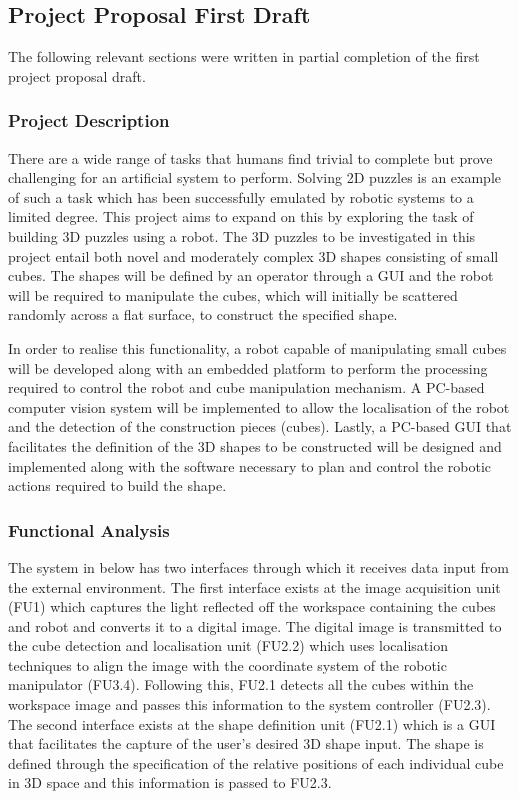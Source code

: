 \subsection{Project Proposal First Draft}

The following relevant sections were written in partial completion of the first project proposal draft.

\subsubsection{Project Description}

There are a wide range of tasks that humans find trivial to complete but prove challenging for an artificial system to perform. Solving 2D puzzles is an example of such a task which has been successfully emulated by robotic systems to a limited degree. This project aims to expand on this by exploring the task of building 3D puzzles using a robot. The 3D puzzles to be investigated in this project entail both novel and moderately complex 3D shapes consisting of small cubes. The shapes will be defined by an operator through a \ac{GUI} and the robot will be required to manipulate the cubes, which will initially be scattered randomly across a flat surface, to construct the specified shape.
 
In order to realise this functionality, a robot capable of manipulating small cubes will be developed along with an embedded platform to perform the processing required to control the robot and cube manipulation mechanism. A PC-based computer vision system will be implemented to allow the localisation of the robot and the detection of the construction pieces (cubes). Lastly, a PC-based \ac{GUI} that facilitates the definition of the 3D shapes to be constructed will be designed and implemented along with the software necessary to plan and control the robotic actions required to build the shape.

\subsubsection{Functional Analysis}

The system in  below has two interfaces through which it receives data input from the external environment. The first interface exists at the image acquisition unit (FU1) which captures the light reflected off the workspace containing the cubes and robot and converts it to a digital image. The digital image is transmitted to the cube detection and localisation unit (FU2.2) which uses localisation techniques to align the image with the coordinate system of the robotic manipulator (FU3.4). Following this, FU2.1 detects all the cubes within the workspace image and passes this information to the system controller (FU2.3). The second interface exists at the shape definition unit (FU2.1) which is a \ac{GUI} that facilitates the capture of the user's desired 3D shape input. The shape is defined through the specification of the relative positions of each individual cube in 3D space and this information is passed to FU2.3.
 
